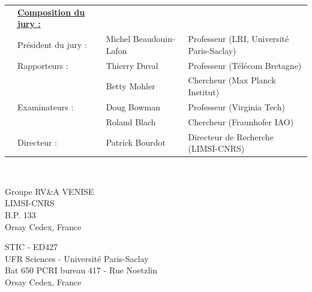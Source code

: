 \begin{titlepage}
\begin{center}
  \begin{tabular}{p{0cm} p{3.6cm} p{4.5cm} l }
    & \footnotesize\bf\underline{Composition du jury :}& &\\
    & \footnotesize{Pr\'esident du jury} : & Michel Beaudouin-Lafon & \footnotesize{Professeur (LRI, Universit\'e Paris-Saclay)} \\
    & \footnotesize{Rapporteurs} : 	& Thierry Duval	& \footnotesize{Professeur (Télécom Bretagne)} \\	
    &							&  Betty Mohler		& \footnotesize{Chercheur (Max Planck Institut)} \\
    & \footnotesize{Examinateurs} : 	& Doug Bowman & \footnotesize{Professeur (Virginia Tech)} \\
    &             &  Roland Blach   & \footnotesize{Chercheur (Fraunhofer IAO)} \\
    & \footnotesize{Directeur} :	& Patrick Bourdot & \footnotesize{Directeur de Recherche (LIMSI-CNRS)} \\
  \end{tabular}
\end{center}

\clearpage
\newpage
\thispagestyle{empty}   

\mbox{~} %

\vfill 

\setlength{\columnsep}{7mm}
\setlength{\columnseprule}{0pt}

\begin{multicols}{2} 
\small 
\noindent Groupe RV\&A VENISE 	\\	
\noindent LIMSI-CNRS					\\
\noindent B.P. 133				\\
 Orsay Cedex, France \\	

\columnbreak

\raggedleft STIC - ED427 \\
\noindent UFR Sciences - Université Paris-Saclay \\
\noindent Bat 650 PCRI bureau 417 - Rue Noetzlin  \\
 Orsay Cedex, France
\end{multicols}

\end{titlepage}